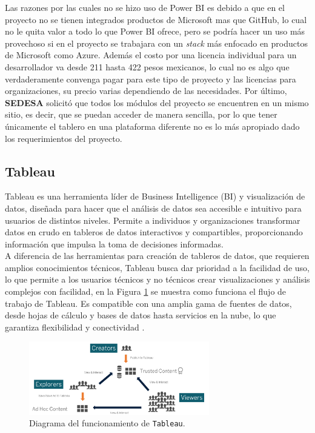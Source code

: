 Las razones por las cuales no se hizo uso de Power BI es debido a que en el proyecto no se tienen integrados productos de Microsoft mas que GitHub, lo cual no le quita valor a todo lo que Power BI ofrece, pero se podría hacer un uso más provechoso si en el proyecto se trabajara con un \textit{stack} más enfocado en productos de Microsoft como Azure. Además el costo por una licencia individual para un desarrollador va desde 211 hasta 422 pesos mexicanos, lo cual no es algo que verdaderamente convenga pagar para este tipo de proyecto y las licencias para organizaciones, su precio varias dependiendo de las necesidades. Por último, \textbf{SEDESA} solicitó que todos los módulos del proyecto se encuentren en un mismo sitio, es decir, que se puedan acceder de manera sencilla, por lo que tener únicamente el tablero en una plataforma diferente no es lo más apropiado dado los requerimientos del proyecto.

\subsection{Tableau}
Tableau es una herramienta líder de Business Intelligence (BI) y visualización de datos, diseñada para hacer que el análisis de datos sea accesible e intuitivo para usuarios de distintos niveles. Permite a individuos y organizaciones transformar datos en crudo en tableros de datos interactivos y compartibles, proporcionando información que impulsa la toma de decisiones informadas.\\
A diferencia de las herramientas para creación de tableros de datos, que requieren amplios conocimientos técnicos, Tableau busca dar prioridad a la facilidad de uso, lo que permite a los usuarios técnicos y no técnicos crear visualizaciones y análisis complejos con facilidad, en la Figura \ref{fig:tableua_workload} se muestra como funciona el flujo de trabajo de Tableau. Es compatible con una amplia gama de fuentes de datos, desde hojas de cálculo y bases de datos hasta servicios en la nube, lo que garantiza flexibilidad y conectividad \cite{tableau_help_use_cases} \cite{costello2020prepare}.

\begin{figure}[H]
    \centering
    \includegraphics[width=0.7\textwidth]{images/bp_use_cases_1.png}
    \caption{Diagrama del funcionamiento de \texttt{Tableau}.} \label{fig:tableua_workload}
\end{figure}

